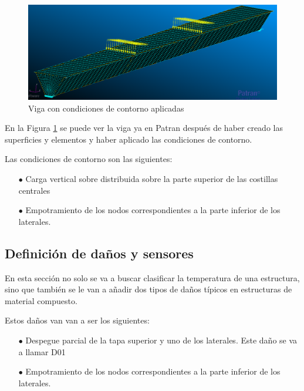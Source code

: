 \begin{figure}[h!]
    \centering
    \includegraphics[width=150mm]{3/Fotos/L_BC.PNG}
    \captionsetup{justification=centering,margin=1.25cm}
    \caption{Viga con condiciones de contorno aplicadas}
    \label{fig:viga_bc}
\end{figure}     

En la Figura \ref{fig:viga_bc} se puede ver la viga ya en Patran después de haber creado las superficies y elementos y haber aplicado las condiciones de contorno. 

Las condiciones de contorno son las siguientes:

\begin{itemize}
    \item[$\bullet$] Carga vertical sobre distribuida sobre la parte superior de las costillas centrales
    \item[$\bullet$] Empotramiento de los nodos correspondientes a la parte inferior de los laterales.
\end{itemize}




\subsection{Definición de daños y sensores}

En esta sección no solo se va a buscar clasificar la temperatura de una estructura, sino que también se le van a añadir dos tipos de daños típicos en estructuras de material compuesto.

Estos daños van van a ser los siguientes:
\begin{itemize}
    \item[$\bullet$] Despegue parcial de la tapa superior y uno de los laterales. Este daño se va a llamar D01
    \item[$\bullet$] Empotramiento de los nodos correspondientes a la parte inferior de los laterales.
\end{itemize}


